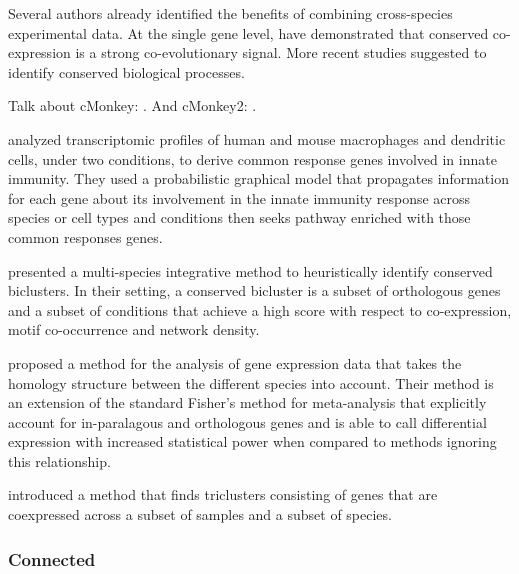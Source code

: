 	Several authors already identified the benefits of combining cross-species experimental data.
	At the single gene level, \textcite{noort2003predicting} have demonstrated that conserved co-expression is a strong co-evolutionary signal.
	More recent  studies suggested to identify conserved biological processes.

	Talk about cMonkey: \parencite{reiss2006integrated}.
	And cMonkey2: \parencite{reiss2015cmonkey2}.

	\Textcite{lu2009cross} analyzed transcriptomic profiles of human and mouse macrophages and dendritic cells, under two conditions, to derive common response genes involved in innate immunity.
	They used a probabilistic graphical model that propagates information for each gene about its involvement in the innate immunity response across species or cell types and conditions then seeks pathway enriched with those common responses genes.

	\Textcite{waltman2010multi} presented a multi-species integrative method to heuristically identify conserved biclusters.
	In their setting, a conserved bicluster is a subset of orthologous genes and a subset of conditions that achieve a high score with respect to co-expression, motif co-occurrence and network density.

	\Textcite{kristiansson2013novel} proposed a method for the analysis of gene expression data that takes the homology structure between the different species into account.
	Their method is an extension of the standard Fisher's method for meta-analysis \parencites{hu2006statistical}{campain2010comparison}{tseng2012comprehensive} that explicitly account for in-paralagous and orthologous genes and is able to call differential expression with increased statistical power when compared to methods ignoring this relationship.

	\Textcite{dede2014triclust} introduced a method that finds triclusters consisting of genes that are coexpressed across a subset of samples and a subset of species.


	\subsubsection{Connected}

